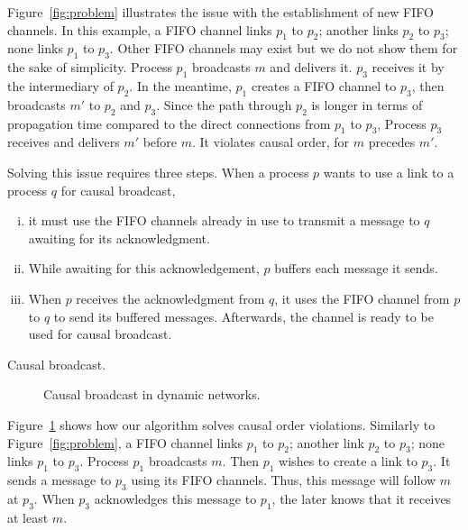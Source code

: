 Figure~\ref{fig:problem} illustrates the issue with the establishment of new
FIFO channels. In this example, a FIFO channel links $p_1$ to $p_2$; another
links $p_2$ to $p_3$; none links $p_1$ to $p_3$. Other FIFO channels may exist
but we do not show them for the sake of simplicity. Process $p_1$ broadcasts $m$
and delivers it. $p_3$ receives it by the intermediary of $p_2$. In the
meantime, $p_1$ creates a FIFO channel to $p_3$, then broadcasts $m'$ to $p_2$
and $p_3$. Since the path through $p_2$ is longer in terms of propagation time
compared to the direct connections from $p_1$ to $p_3$, Process $p_3$ receives
and delivers $m'$ before $m$. It violates causal order, for $m$ precedes $m'$.


Solving this issue requires three steps. When a process $p$ wants to use a link to
a process $q$ for causal broadcast,
\begin{enumerate}[(i)]
\item it must use the FIFO channels already in use to transmit a message to $q$
  awaiting for its acknowledgment.
\item While awaiting for this acknowledgement, $p$ buffers each message it
  sends.
\item When $p$ receives the acknowledgment from $q$, it uses the FIFO channel
  from $p$ to $q$ to send its buffered messages. Afterwards, the channel is
  ready to be used for causal broadcast.
\end{enumerate}

\begin{algorithm*}[h]
  
  \caption{\label{algo:causalbroadcast}Causal broadcast.}
\end{algorithm*}

\begin{figure}
  \begin{center}
    
    \caption{\label{fig:solved}Causal broadcast in dynamic networks.}
  \end{center}
\end{figure}

Figure~\ref{fig:solved} shows how our algorithm solves causal order
violations. Similarly to Figure~\ref{fig:problem}, a FIFO channel links $p_1$ to
$p_2$; another link $p_2$ to $p_3$; none links $p_1$ to $p_3$. Process $p_1$
broadcasts $m$. Then $p_1$ wishes to create a link to $p_3$. It sends a message
to $p_3$ using its FIFO channels. Thus, this message will follow $m$ at
$p_3$. When $p_3$ acknowledges this message to $p_1$, the later knows that it
receives at least $m$.


